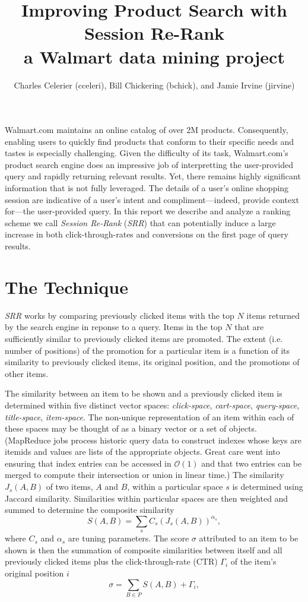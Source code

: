 \documentclass{article}
\title{Improving Product Search with Session Re-Rank\\
    \large{a Walmart data mining project}}
\author{Charles Celerier (cceleri), Bill Chickering (bchick),
        and Jamie Irvine (jirvine)}
\begin{document}
\maketitle

Walmart.com maintains an online catalog of over 2M products. Consequently,
enabling users to quickly find products that conform to their specific needs and
tastes is especially challenging. Given the difficulty of its task,
Walmart.com's product search engine does an impressive job of interpretting the
user-provided query and rapidly returning relevant results. Yet, there remains
highly significant information that is not fully leveraged. The details of a
user's online shopping session are indicative of a user's intent and
compliment---indeed, provide context for---the user-provided query. In this
report we describe and analyze a ranking scheme we call {\em Session Re-Rank}
({\em SRR}) that can potentially induce a large increase in both
click-through-rates and conversions on the first page of query results.

\section{The Technique}\label{sec:technique}

{\em SRR} works by comparing previously clicked items with the top $N$ items
returned by the search engine in reponse to a query. Items in the top $N$ that
are sufficiently similar to previously clicked items are promoted. The extent
(i.e. number of positions) of the promotion for a particular item is a function
of its similarity to previously clicked items, its original position, and the
promotions of other items.

The similarity between an item to be shown and a previously clicked item is
determined within five distinct vector spaces: {\em click-space}, {\em
cart-space}, {\em query-space}, {\em title-space}, {\em item-space}. The
non-unique representation of an item within each of these spaces may be thought
of as a binary vector or a set of objects. (MapReduce jobs process historic
query data to construct indexes whose keys are itemids and values are lists of
the appropriate objects. Great care went into ensuring that index entries can be
accessed in $\mathcal{O}(1)$ and that two entries can be merged to compute their
intersection or union in linear time.) The similarity $J_s(A, B)$ of two items,
$A$ and $B$, within a particular space $s$ is determined using Jaccard
similarity. Similarities within particular spaces are then weighted and summed
to determine the composite similarity
\begin{equation}\label{eqn:similarity_metric}
    S(A, B) = \sum_s{C_s(J_s(A, B))^{\alpha_s}},
\end{equation}
where $C_s$ and $\alpha_s$ are tuning parameters. The score $\sigma$ attributed
to an item to be shown is then the summation of composite similarities between
itself and all previously clicked items plus the click-through-rate (CTR)
$\Gamma_i$ of the item's original position $i$
\begin{equation*}
    \sigma = \sum_{B \in P}{S(A, B)} + \Gamma_i,
\end{equation*}
\end{document}
